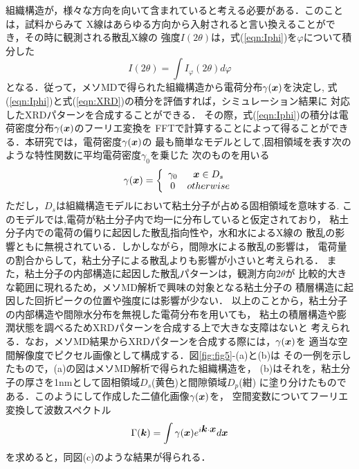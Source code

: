 組織構造が，様々な方向を向いて含まれていると考える必要がある．このことは，試料からみて
X線はあらゆる方向から入射されると言い換えることができ，その時に観測される散乱X線の
強度$I(2\theta)$は，式(\ref{eqn:Iphi})を$\varphi$について積分した
\begin{equation}
	I(2\theta)=\int I_{\varphi}(2\theta) d\varphi
	\label{eqn:XRD}
\end{equation}
となる．従って，メソMDで得られた組織構造から電荷分布$\gamma(\mbox{\boldmath $x$})$を決定し,
式(\ref{eqn:Iphi})と式(\ref{eqn:XRD})の積分を評価すれば，シミュレーション結果に
対応したXRDパターンを合成することができる．
その際，式(\ref{eqn:Iphi})の積分は電荷密度分布$\gamma(\mbox{\boldmath $x$})$のフーリエ変換を
FFTで計算することによって得ることができる．本研究では，電荷密度$\gamma(\mbox{\boldmath $x$})$の
最も簡単なモデルとして,固相領域を表す次のような特性関数に平均電荷密度$\gamma_0$を乗じた
次のものを用いる
\begin{equation}
	\gamma(\mbox{\boldmath $x$})=\left\{
		\begin{array}{cc}
		\gamma_0 &  \mbox{\boldmath $x$} \in D_s \\
			0 &  otherwise
		\end{array}
	\right.
	\label{eqn:gamma}
\end{equation}
ただし，$D_s$は組織構造モデルにおいて粘土分子が占める固相領域を意味する.
このモデルでは,電荷が粘土分子内で均一に分布していると仮定されており，
粘土分子内での電荷の偏りに起因した散乱指向性や，水和水によるX線の
散乱の影響ともに無視されている．しかしながら，間隙水による散乱の影響は，
電荷量の割合からして，粘土分子による散乱よりも影響が小さいと考えられる．
また，粘土分子の内部構造に起因した散乱パターンは，観測方向$2\theta$が
比較的大きな範囲に現れるため，メソMD解析で興味の対象となる粘土分子の
積層構造に起因した回折ピークの位置や強度には影響が少ない．
以上のことから，粘土分子の内部構造や間隙水分布を無視した電荷分布を用いても，
粘土の積層構造や膨潤状態を調べるためXRDパターンを合成する上で大きな支障はないと
考えられる．なお，メソMD結果からXRDパターンを合成する際には，$\gamma(\mbox{\boldmath $x$})$を
適当な空間解像度でピクセル画像として構成する．図\ref{fig:fig5}-(a)と(b)は
その一例を示したもので，(a)の図はメソMD解析で得られた組織構造を，
(b)はそれを，粘土分子の厚さを1nmとして固相領域$D_s$(黄色)と間隙領域$D_p$(紺)
に塗り分けたものである．このようにして作成した二値化画像$\gamma(\mbox{\boldmath $x$})$を，
空間変数についてフーリエ変換して波数スペクトル
\begin{equation}
	\Gamma(\mbox{\boldmath $k$})=\int \gamma(\mbox{\boldmath $x$}) e^{i\mbox{\boldmath $k$}\cdot\mbox{\boldmath $x$}} d\mbox{\boldmath $x$}
	\label{eqn:Gamma}
\end{equation}
を求めると，同図(c)のような結果が得られる．
